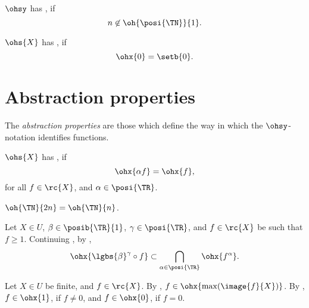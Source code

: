 \documentclass[b5paper, english, oneside]{memoir}
\begin{document}
\begin{definition}
$\ohsy$ has , if
\begin{equation}
n \not\in \oh{\posi{\TN}}{1}.
\end{equation}
\end{definition}

\begin{definition}
$\ohs{X}$ has , if
\begin{equation}
\ohx{0} = \setb{0}.
\end{equation}
\end{definition}

\section{Abstraction properties}

The \emph{abstraction properties} are those which define the way in which the $\ohsy$-notation identifies functions. 

\begin{definition}
$\ohs{X}$ has , if
\begin{equation}
\ohx{\alpha f} = \ohx{f},
\end{equation}
for all $f \in \rc{X}$, and $\alpha \in \posi{\TR}$.
\end{definition}

\begin{example}
$\oh{\TN}{2n} = \oh{\TN}{n}$.
\end{example}

\begin{example}
Let $X \in U$, $\beta \in \posib{\TR}{1}$, $\gamma \in \posi{\TR}$, and $f \in \rc{X}$ be such that $f \geq 1$. Continuing , by ,
\begin{equation}
\ohx{\lgbs{\beta}^{\gamma} \circ f} \subset \bigcap_{\alpha \in \posi{\TR}} \ohx{f^{\alpha}}.
\end{equation}
\end{example}

\begin{example}
Let $X \in U$ be finite, and $f \in \rc{X}$. By , $f \in \ohx{\max(\image{f}{X})}$. By , $f \in \ohx{1}$, if $f \neq 0$, and $f \in \ohx{0}$, if $f = 0$.
\end{example}
\end{document}
